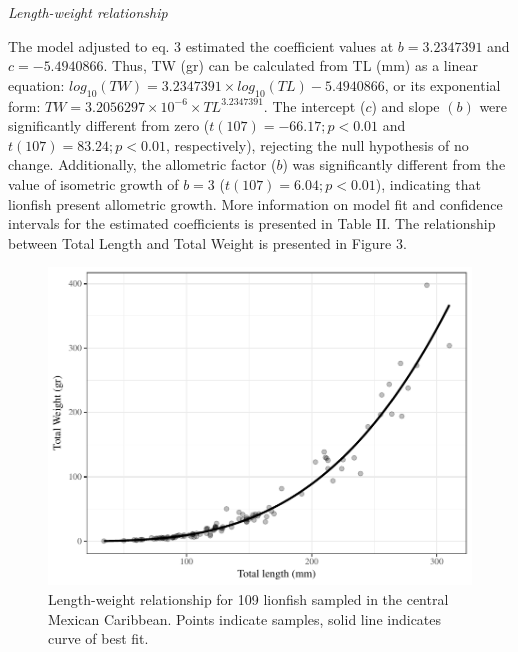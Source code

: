 \documentclass[12pt,]{article}
\begin{document}
\emph{Length-weight relationship}

The model adjusted to eq. 3 estimated the coefficient values at
\(b = 3.2347391\) and \(c = -5.4940866\). Thus, TW (gr) can be
calculated from TL (mm) as a linear equation:
\(log_{10}(TW) = 3.2347391\times log_{10}(TL) -5.4940866\), or its
exponential form: \(TW = 3.2056297\times 10^{-6}\times TL^{3.2347391}\).
The intercept (\(c\)) and slope \((b)\) were significantly different
from zero (\(t(107) = -66.17; p<0.01\) and \(t(107) = 83.24; p<0.01\),
respectively), rejecting the null hypothesis of no change. Additionally,
the allometric factor (\(b\)) was significantly different from the value
of isometric growth of \(b = 3\) (\(t(107) = 6.04; p<0.01\)), indicating
that lionfish present allometric growth. More information on model fit
and confidence intervals for the estimated coefficients is presented in
Table II. The relationship between Total Length and Total Weight is
presented in Figure 3.

\begin{figure}[htbp]
\centering
\includegraphics{Manuscript_files/figure-latex/scatter plot-1.pdf}
\caption{Length-weight relationship for 109 lionfish sampled in the
central Mexican Caribbean. Points indicate samples, solid line indicates
curve of best fit.}
\end{figure}
\end{document}
